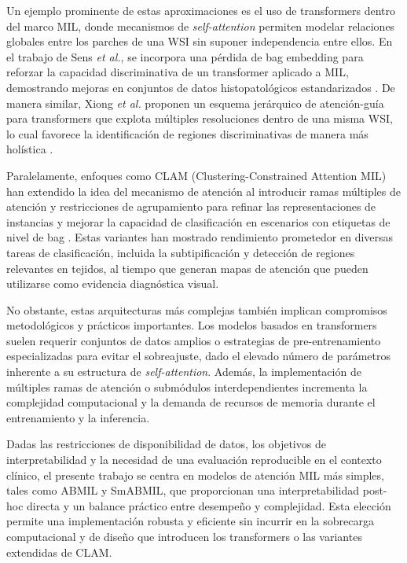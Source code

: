 Un ejemplo prominente de estas aproximaciones es el uso de transformers dentro del marco MIL, donde mecanismos de \textit{self-attention} permiten modelar relaciones globales entre los parches de una WSI sin suponer independencia entre ellos. En el trabajo de Sens \textit{et al.}, se incorpora una pérdida de bag embedding para reforzar la capacidad discriminativa de un transformer aplicado a MIL, demostrando mejoras en conjuntos de datos histopatológicos estandarizados \cite{Sens2023_TransMIL}. De manera similar, Xiong \textit{et al.} proponen un esquema jerárquico de atención-guía para transformers que explota múltiples resoluciones dentro de una misma WSI, lo cual favorece la identificación de regiones discriminativas de manera más holística \cite{Xiong2023_TransformerMIL}.\newline

Paralelamente, enfoques como CLAM (Clustering-Constrained Attention MIL) han extendido la idea del mecanismo de atención al introducir ramas múltiples de atención y restricciones de agrupamiento para refinar las representaciones de instancias y mejorar la capacidad de clasificación en escenarios con etiquetas de nivel de bag \cite{Lu2021_CLAM}. Estas variantes han mostrado rendimiento prometedor en diversas tareas de clasificación, incluida la subtipificación y detección de regiones relevantes en tejidos, al tiempo que generan mapas de atención que pueden utilizarse como evidencia diagnóstica visual.\newline

No obstante, estas arquitecturas más complejas también implican compromisos metodológicos y prácticos importantes. Los modelos basados en transformers suelen requerir conjuntos de datos amplios o estrategias de pre-entrenamiento especializadas para evitar el sobreajuste, dado el elevado número de parámetros inherente a su estructura de \textit{self-attention}. Además, la implementación de múltiples ramas de atención o submódulos interdependientes incrementa la complejidad computacional y la demanda de recursos de memoria durante el entrenamiento y la inferencia.\newline

Dadas las restricciones de disponibilidad de datos, los objetivos de interpretabilidad y la necesidad de una evaluación reproducible en el contexto clínico, el presente trabajo se centra en modelos de atención MIL más simples, tales como ABMIL y SmABMIL, que proporcionan una interpretabilidad post-hoc directa y un balance práctico entre desempeño y complejidad. Esta elección permite una implementación robusta y eficiente sin incurrir en la sobrecarga computacional y de diseño que introducen los transformers o las variantes extendidas de CLAM.








